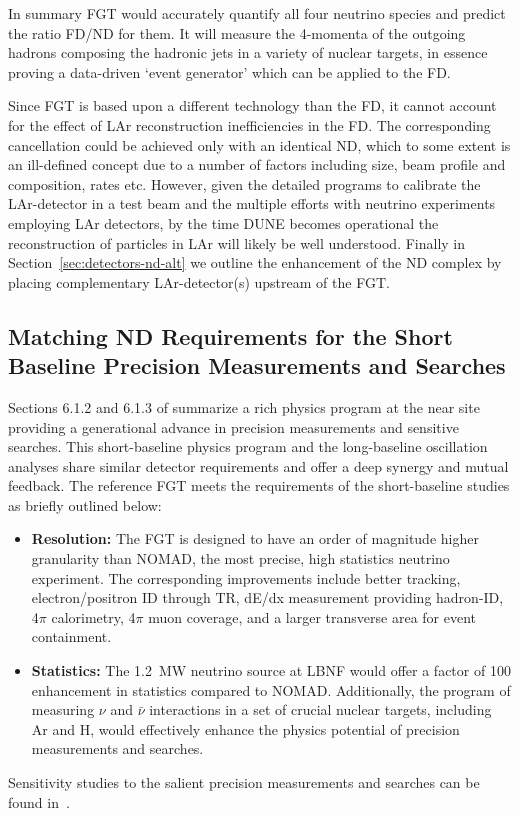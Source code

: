 In summary FGT would accurately quantify all four neutrino species and
predict the ratio FD/ND for them.  It will measure the 4-momenta of
the outgoing hadrons composing the hadronic jets in a variety of
nuclear targets, in essence proving a data-driven `event generator'
which can be applied to the FD.

Since FGT is based upon a different technology than the FD, it cannot
account for the effect of LAr reconstruction inefficiencies in the
FD. The corresponding cancellation could be achieved only with an
identical ND, which to some extent is an ill-defined concept due to a
number of factors including size, beam profile and composition, rates
etc. However, given the detailed programs to calibrate the
LAr-detector in a test beam and the multiple efforts with neutrino
experiments employing LAr detectors, by the time DUNE becomes
operational the reconstruction of particles in LAr will likely be well
understood. Finally in Section~\ref{sec:detectors-nd-alt} we outline
the enhancement of the ND complex by placing complementary
LAr-detector(s) upstream of the FGT.

\subsection{Matching ND Requirements for the Short Baseline Precision Measurements and Searches} 
\label{cdrsec:detectors-nd-ref-fgt-req-sbp}


Sections 6.1.2
and 6.1.3 of \volphys
summarize a rich physics program at the near site providing a
generational advance in precision measurements and sensitive searches.
This short-baseline physics program and the long-baseline oscillation
analyses share similar detector requirements and offer a deep synergy
and mutual feedback.  The reference FGT meets the requirements of the
short-baseline studies as briefly outlined below:
\begin{itemize}
    \item {\bf Resolution:} The FGT is designed to have an order of magnitude higher granularity than NOMAD, 
    the most precise, high statistics neutrino experiment. The corresponding improvements include better tracking, 
    electron/positron ID through TR, dE/dx measurement providing hadron-ID, 4$\pi$ calorimetry,
     4$\pi$ muon coverage, and a larger transverse area for event containment. 
    
    \item {\bf Statistics:} The 1.2~MW neutrino source at LBNF would offer a factor of 100 enhancement in statistics 
    compared to NOMAD. Additionally, the program of measuring $\nu$ and $\bar\nu$ interactions 
    in a set of crucial nuclear targets, including Ar and H, would effectively enhance the physics potential 
    of precision measurements and searches.  
\end{itemize}
Sensitivity studies to the salient precision measurements and searches can be found in~\cite{Adams:2013qkq, DPR}. 


